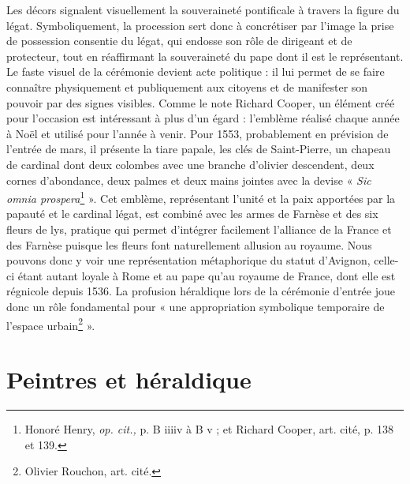 \documentclass[12pt,twoside,openany]{book}
\begin{document}
Les décors signalent visuellement la souveraineté pontificale à travers la figure du légat. Symboliquement, la procession sert donc à concrétiser par l’image la prise de possession consentie du légat, qui endosse son rôle de dirigeant et de protecteur, tout en réaffirmant la souveraineté du pape dont il est le représentant. Le faste visuel de la cérémonie devient acte politique : il lui permet de se faire connaître physiquement et publiquement aux citoyens et de manifester son pouvoir par des signes visibles. Comme le note Richard Cooper, un élément créé pour l’occasion est intéressant à plus d’un égard : l’emblème réalisé chaque année à Noël et utilisé pour l’année à venir. Pour 1553, probablement en prévision de l’entrée de mars, il présente la tiare papale, les clés de Saint-Pierre, un chapeau de cardinal dont deux colombes avec une branche d’olivier descendent, deux cornes d’abondance, deux palmes et deux mains jointes avec la devise « \textit{Sic omnia prospera}\footnote{Honoré Henry, \textit{op. cit.,} p. B iiiiv à B v ; et Richard Cooper, art. cité, p. 138 et 139.} ». Cet emblème, représentant l’unité et la paix apportées par la papauté et le cardinal légat, est combiné avec les armes de Farnèse et des six fleurs de lys, pratique qui permet d’intégrer facilement l’alliance de la France et des Farnèse puisque les fleurs font naturellement allusion au royaume. Nous pouvons donc y voir une représentation métaphorique du statut d’Avignon, celle-ci étant autant loyale à Rome et au pape qu’au royaume de France, dont elle est régnicole depuis 1536. La profusion héraldique lors de la cérémonie d’entrée joue donc un rôle fondamental pour « une appropriation symbolique temporaire de l’espace urbain\footnote{Olivier Rouchon, art. cité.} ».

\section{Peintres et héraldique}
\end{document}
